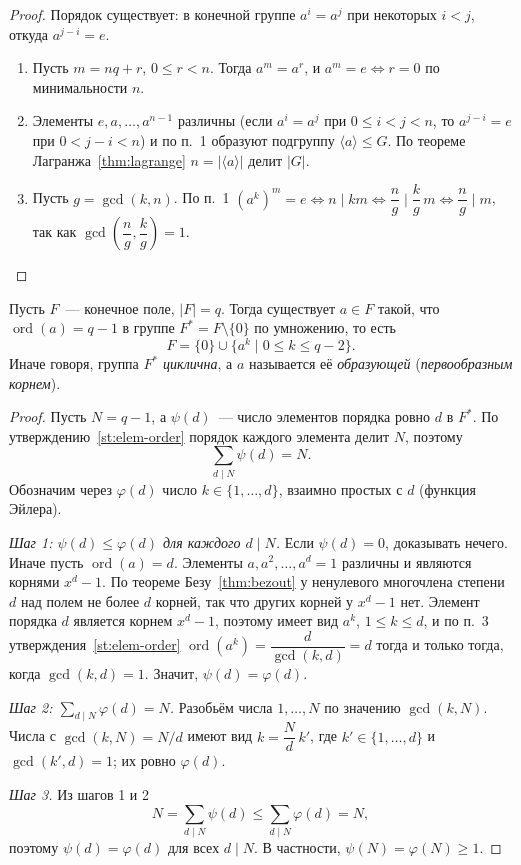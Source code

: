 \documentclass[12pt]{article}
\begin{document}
	\begin{proof}
		Порядок существует: в конечной группе $a^i = a^j$ при некоторых $i < j$, откуда $a^{j-i} = e$.
		\begin{enumerate}
			\item Пусть $m = nq + r$, $0 \leqslant r < n$. Тогда $a^m = a^r$, и $a^m = e \iff r = 0$ по минимальности $n$.
			\item Элементы $e, a, \dots, a^{n-1}$ различны (если $a^i = a^j$ при $0 \leqslant i < j < n$, то $a^{j-i} = e$ при $0 < j - i < n$) и по п.~1 образуют подгруппу $\langle a \rangle \leqslant G$. По теореме Лагранжа~\ref{thm:lagrange} $n = |\langle a \rangle|$ делит $|G|$.
			\item Пусть $g = \gcd(k, n)$. По п.~1 $(a^k)^m = e \iff n \mid km \iff \dfrac{n}{g} \mid \dfrac{k}{g}\,m \iff \dfrac{n}{g} \mid m$, так как $\gcd\!\left(\dfrac{n}{g}, \dfrac{k}{g}\right) = 1$.
		\end{enumerate}
	\end{proof}

	\begin{theorem}\label{thm:fin-cyclic}
		Пусть $F$~--- конечное поле, $|F| = q$. Тогда существует $a \in F$ такой, что $\operatorname{ord}(a) = q - 1$ в группе $F^* = F \setminus \{0\}$ по умножению, то есть
		\[
			F = \{0\} \cup \{ a^k \mid 0 \leqslant k \leqslant q - 2 \}.
		\]
		Иначе говоря, группа $F^*$ \emph{циклична}, а $a$ называется её \emph{образующей} (\emph{первообразным корнем}).
	\end{theorem}

	\begin{proof}
		Пусть $N = q - 1$, а $\psi(d)$~--- число элементов порядка ровно $d$ в $F^*$. По утверждению~\ref{st:elem-order} порядок каждого элемента делит $N$, поэтому
		\[
			\sum_{d \mid N} \psi(d) = N.
		\]
		Обозначим через $\varphi(d)$ число $k \in \{1, \dots, d\}$, взаимно простых с $d$ (функция Эйлера).

		\emph{Шаг 1: $\psi(d) \leqslant \varphi(d)$ для каждого $d \mid N$.} Если $\psi(d) = 0$, доказывать нечего. Иначе пусть $\operatorname{ord}(a) = d$. Элементы $a, a^2, \dots, a^d = 1$ различны и являются корнями $x^d - 1$. По теореме Безу~\ref{thm:bezout} у ненулевого многочлена степени $d$ над полем не более $d$ корней, так что других корней у $x^d - 1$ нет. Элемент порядка $d$ является корнем $x^d - 1$, поэтому имеет вид $a^k$, $1 \leqslant k \leqslant d$, и по п.~3 утверждения~\ref{st:elem-order} $\operatorname{ord}(a^k) = \dfrac{d}{\gcd(k, d)} = d$ тогда и только тогда, когда $\gcd(k, d) = 1$. Значит, $\psi(d) = \varphi(d)$.

		\emph{Шаг 2: $\sum_{d \mid N} \varphi(d) = N$.} Разобьём числа $1, \dots, N$ по значению $\gcd(k, N)$. Числа с $\gcd(k, N) = N/d$ имеют вид $k = \dfrac{N}{d}\,k'$, где $k' \in \{1, \dots, d\}$ и $\gcd(k', d) = 1$; их ровно $\varphi(d)$.

		\emph{Шаг 3.} Из шагов 1 и 2
		\[
			N = \sum_{d \mid N} \psi(d) \leqslant \sum_{d \mid N} \varphi(d) = N,
		\]
		поэтому $\psi(d) = \varphi(d)$ для всех $d \mid N$. В частности, $\psi(N) = \varphi(N) \geqslant 1$.
	\end{proof}
\end{document}
